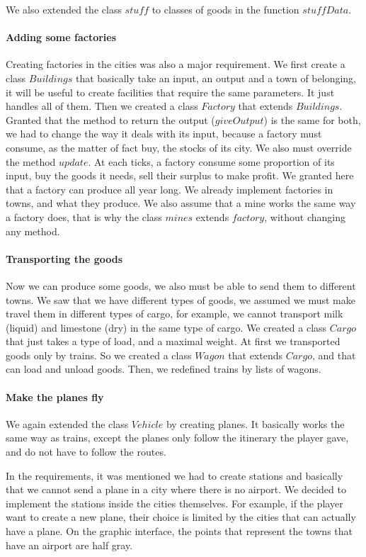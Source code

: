 \documentclass[a4paper]{article}
\begin{document}
	We also extended the class $stuff$ to classes of goods in the function $ stuffData$.

	\paragraph{Adding some factories}
	Creating factories in the cities was also a major requirement. We first create a class $Buildings$ that basically take an input, an output and a town of belonging, it will be useful to create facilities that require the same parameters. It just handles all of them. Then we created a class $Factory$ that extends $Buildings$. Granted that the method to return the output ($giveOutput$) is the same for both, we had to change the way it deals with its input, because a factory must consume, as the matter of fact buy, the stocks of its city. We also must override the method $update$. At each ticks, a factory consume some proportion of its input, buy the goods it needs, sell their surplus to make profit. We granted here that a factory can produce all year long. We already implement factories in towns, and what they produce.
	 We also assume that a mine works the same way a factory does, that is why the class $mines$ extends $factory$, without changing any method.

	\paragraph{Transporting the goods}
	Now we can produce some goods, we also must be able to send them to different towns. We saw that we have different types of goods, we assumed we must make travel them in different types of cargo, for example, we cannot transport milk (liquid) and limestone (dry) in the same type of cargo. We created a class $Cargo$ that just takes a type of load, and a maximal weight. At first we transported goods only by trains. So we created a class $Wagon$ that extends $Cargo$, and that can load and unload goods. Then, we redefined trains by lists of wagons.

	\paragraph{Make the planes fly}
	We again extended the class $Vehicle$ by creating planes. It basically works the same way as trains, except the planes only follow the itinerary the player gave, and do not have to follow the routes.

	In the requirements, it was mentioned we had to create stations and basically that we cannot send a plane in a city where there is no airport. We decided to implement the stations inside the cities themselves. For example, if the player want to create a new plane, their choice is limited by the cities that can actually have a plane. On the graphic interface, the points that represent the towns that have an airport are half gray.
\end{document}
